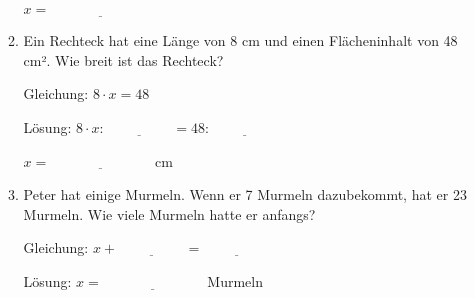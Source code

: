 \begin{enumerate}[label=\arabic*.]
\begin{enumerate}[label=\alph*)]
        $x = \underline{\hspace{3cm}}$

        \vspace{0.5cm}

        \item Ein Rechteck hat eine Länge von 8 cm und einen Flächeninhalt von 48 cm². Wie breit ist das Rechteck?

        Gleichung: $8 \cdot x = 48$

        Lösung: $8 \cdot x : \underline{\hspace{2cm}} = 48 : \underline{\hspace{2cm}}$

        $x = \underline{\hspace{3cm}}$ cm

        \vspace{0.5cm}

        \item Peter hat einige Murmeln. Wenn er 7 Murmeln dazubekommt, hat er 23 Murmeln. Wie viele Murmeln hatte er anfangs?

        Gleichung: $x + \underline{\hspace{2cm}} = \underline{\hspace{2cm}}$

        Lösung: $x = \underline{\hspace{3cm}}$ Murmeln
    \end{enumerate}
\end{enumerate}